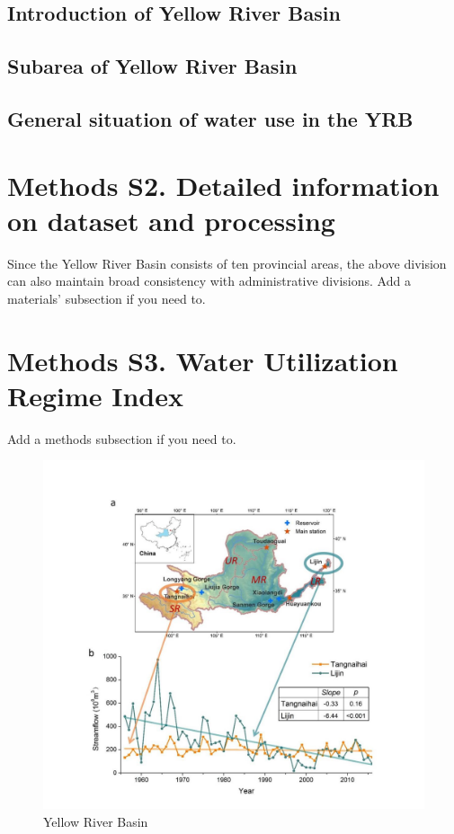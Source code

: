 \documentclass[9pt,twoside,lineno]{pnas-new}
\begin{document}
\subsection*{Introduction of Yellow River Basin}
\subsection*{Subarea of Yellow River Basin}
\subsection*{General situation of water use in the YRB}

\section*{Methods S2. Detailed information on dataset and processing}
Since the Yellow River Basin consists of ten provincial areas, the above division can also maintain broad consistency with administrative divisions.
Add a materials' subsection if you need to.

\section*{Methods S3. Water Utilization Regime Index}
Add a methods subsection if you need to.


\begin{figure}
    \centering
    \includegraphics[width=\textwidth]{../../figures/supplementary_information/YRB.jpg}
    \caption{Yellow River Basin}
\end{figure}
\end{document}
